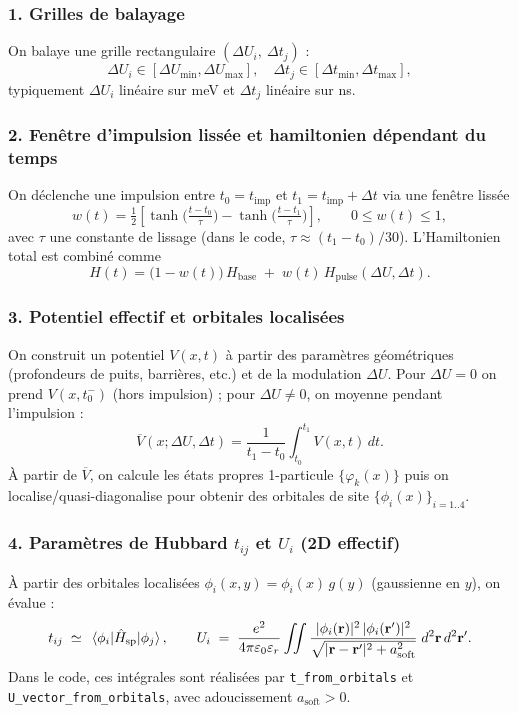 \documentclass{article}
\begin{document}
\subsubsection*{1. Grilles de balayage}
On balaye une grille rectangulaire $(\Delta U_i,\ \Delta t_j)$ :
\[
\Delta U_i \in [\Delta U_{\min},\Delta U_{\max}],\quad
\Delta t_j \in [\Delta t_{\min},\Delta t_{\max}],
\]
typiquement $\Delta U_i$ linéaire sur \si{\milli\electronvolt} et $\Delta t_j$ linéaire sur \si{\nano\second}.

\subsubsection*{2. Fenêtre d’impulsion lissée et hamiltonien dépendant du temps}
On déclenche une impulsion entre $t_0=t_{\mathrm{imp}}$ et $t_1=t_{\mathrm{imp}}+\Delta t$ via une fenêtre lissée
\[
w(t)=\tfrac{1}{2}\!\left[\tanh\!\Big(\tfrac{t-t_0}{\tau}\Big)-\tanh\!\Big(\tfrac{t-t_1}{\tau}\Big)\right],\qquad
0\le w(t)\le 1,
\]
avec $\tau$ une constante de lissage (dans le code, $\tau \approx (t_1-t_0)/30$).
L’Hamiltonien total est combiné comme
\[
H(t)=\big(1-w(t)\big)\,H_{\text{base}} \;+\; w(t)\,H_{\text{pulse}}(\Delta U,\Delta t).
\]

\subsubsection*{3. Potentiel effectif et orbitales localisées}
On construit un potentiel $V(x,t)$ à partir des paramètres géométriques (profondeurs de puits, barrières, etc.) et de la modulation $\Delta U$.
Pour $\Delta U=0$ on prend $V(x,t_0^-)$ (hors impulsion) ; pour $\Delta U\neq 0$, on
moyenne pendant l’impulsion :
\[
\overline{V}(x;\Delta U,\Delta t)=\frac{1}{t_1-t_0}\int_{t_0}^{t_1} V(x,t)\,dt.
\]
À partir de $\overline{V}$, on calcule les états propres 1-particule $\{\varphi_k(x)\}$ puis on
localise/quasi-diagonalise pour obtenir des orbitales de site $\{\phi_i(x)\}_{i=1..4}$.

\subsubsection*{4. Paramètres de Hubbard $t_{ij}$ et $U_i$ (2D effectif)}
À partir des orbitales localisées $\phi_i(x,y)=\phi_i(x)\,g(y)$ (gaussienne en $y$), on évalue :
\[
t_{ij}\;\simeq\;\matrixelement{\phi_i}{\hat{H}_{\text{sp}}}{\phi_j},
\qquad
U_i\;=\;\frac{e^2}{4\pi \varepsilon_0 \varepsilon_r}
\iint \frac{|\phi_i(\mathbf{r})|^2\,|\phi_i(\mathbf{r}')|^2}
{\sqrt{|\mathbf{r}-\mathbf{r}'|^2+a_{\text{soft}}^2}}\;d^2\mathbf{r}\,d^2\mathbf{r}'.
\]
Dans le code, ces intégrales sont réalisées par \texttt{t\_from\_orbitals} et
\texttt{U\_vector\_from\_orbitals}, avec adoucissement $a_{\text{soft}}>0$.
\end{document}

